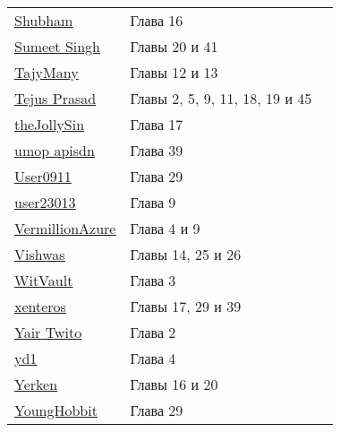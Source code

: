 \begin{tabular}{p{}ll}
\href{https://stackoverflow.com/users/3160529/}{\underline{Shubham}} & Глава 16 \\
\href{https://stackoverflow.com/users/4391177/}{\underline{Sumeet Singh}} & Главы 20 и 41 \\
\href{https://stackoverflow.com/users/1524047/}{\underline{TajyMany}} & Главы 12 и 13 \\
\href{https://stackoverflow.com/users/3409405/}{\underline{Tejus Prasad}} & Главы 2, 5, 9, 11, 18, 19 и 45 \\
\href{https://stackoverflow.com/users/1287593/}{\underline{theJollySin}} & Глава 17 \\
\href{https://stackoverflow.com/users/7533465/}{\underline{umop apisdn}} & Глава 39 \\
\href{https://stackoverflow.com/users/1796837/}{\underline{User0911}} & Глава 29 \\
\href{https://stackoverflow.com/users/3998030/}{\underline{user23013}} & Глава 9 \\
\href{https://stackoverflow.com/users/3819850/}{\underline{VermillionAzure}} & Глава 4 и 9 \\
\href{https://stackoverflow.com/users/3870293/}{\underline{Vishwas}} & Главы 14, 25 и 26 \\
\href{https://stackoverflow.com/users/1745409/}{\underline{WitVault}} & Глава 3 \\
\href{https://stackoverflow.com/users/4723795/}{\underline{xenteros}} & Главы 17, 29 и 39 \\
\href{https://stackoverflow.com/users/6709421/}{\underline{Yair Twito}} & Глава 2 \\
\href{https://stackoverflow.com/users/6952491/}{\underline{yd1}} & Глава 4 \\
\href{https://stackoverflow.com/users/1597656/}{\underline{Yerken}} & Главы 16 и 20 \\
\href{https://stackoverflow.com/users/2254048/}{\underline{YoungHobbit}} & Глава 29 \\
\end{tabular}
